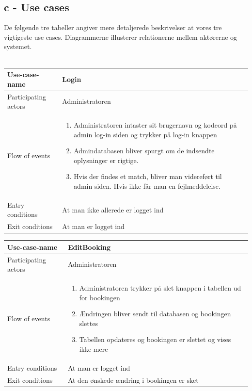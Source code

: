 \documentclass[12pt,a4paper]{article}
\begin{document}
\subsection{c - Use cases}
De følgende tre tabeller angiver mere detaljerede beskrivelser at vores tre vigtigeste use cases. Diagrammerne illusterer relationerne mellem aktørerne og systemet. \\\\
\begin{minipage}{\textwidth}

 \label{tab:title}
\begin{tabular}{| p{5cm} p{10cm} |}
\hline Use-case-name & Login \\
\hline Participating actors & Administratoren \\
\hline Flow of events & \begin{enumerate}
\item Administratoren intaster sit brugernavn og kodeord på admin log-in siden og trykker på log-in knappen
\item Admindatabasen bliver spurgt om de indsendte oplysninger er rigtige.
\item Hvis der findes et match, bliver man videreført til admin-siden. Hvis ikke får man en fejlmeddelelse.
\end{enumerate} \\
\hline Entry conditions & At man ikke allerede er logget ind \\
\hline Exit conditions & At man er logget ind \\
\hline
\end{tabular}

\end{minipage}

\bigskip

\begin{minipage}{\textwidth}

 \label{tab:title}
\begin{tabular}{| p{5cm} p{10cm} |}
\hline Use-case-name & EditBooking \\
\hline Participating actors & Administratoren \\
\hline Flow of events & \begin{enumerate}
\item Administratoren trykker på slet knappen i tabellen ud for bookingen 
\item Ændringen bliver sendt til databasen og bookingen slettes
\item Tabellen opdateres og bookingen er slettet og vises ikke mere
\end{enumerate} \\
\hline Entry conditions & At man er logget ind \\
\hline Exit conditions & At den ønskede ændring i bookingen er sket \\
\hline
\end{tabular}

\end{minipage}
	
\end{document}
